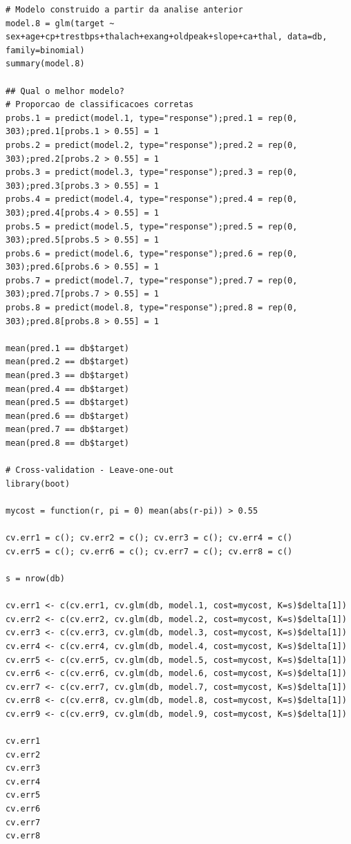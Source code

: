 \documentclass[a4paper]{report}
\begin{document}
\begin{lstlisting}[breaklines,basicstyle=\small]
# Modelo construido a partir da analise anterior
model.8 = glm(target ~ sex+age+cp+trestbps+thalach+exang+oldpeak+slope+ca+thal, data=db, family=binomial)
summary(model.8)

## Qual o melhor modelo?
# Proporcao de classificacoes corretas
probs.1 = predict(model.1, type="response");pred.1 = rep(0, 303);pred.1[probs.1 > 0.55] = 1 
probs.2 = predict(model.2, type="response");pred.2 = rep(0, 303);pred.2[probs.2 > 0.55] = 1 
probs.3 = predict(model.3, type="response");pred.3 = rep(0, 303);pred.3[probs.3 > 0.55] = 1 
probs.4 = predict(model.4, type="response");pred.4 = rep(0, 303);pred.4[probs.4 > 0.55] = 1 
probs.5 = predict(model.5, type="response");pred.5 = rep(0, 303);pred.5[probs.5 > 0.55] = 1 
probs.6 = predict(model.6, type="response");pred.6 = rep(0, 303);pred.6[probs.6 > 0.55] = 1 
probs.7 = predict(model.7, type="response");pred.7 = rep(0, 303);pred.7[probs.7 > 0.55] = 1
probs.8 = predict(model.8, type="response");pred.8 = rep(0, 303);pred.8[probs.8 > 0.55] = 1

mean(pred.1 == db$target)
mean(pred.2 == db$target)
mean(pred.3 == db$target)
mean(pred.4 == db$target)
mean(pred.5 == db$target)
mean(pred.6 == db$target)
mean(pred.7 == db$target)
mean(pred.8 == db$target)

# Cross-validation - Leave-one-out
library(boot)

mycost = function(r, pi = 0) mean(abs(r-pi)) > 0.55

cv.err1 = c(); cv.err2 = c(); cv.err3 = c(); cv.err4 = c()
cv.err5 = c(); cv.err6 = c(); cv.err7 = c(); cv.err8 = c()

s = nrow(db)

cv.err1 <- c(cv.err1, cv.glm(db, model.1, cost=mycost, K=s)$delta[1])
cv.err2 <- c(cv.err2, cv.glm(db, model.2, cost=mycost, K=s)$delta[1])
cv.err3 <- c(cv.err3, cv.glm(db, model.3, cost=mycost, K=s)$delta[1])
cv.err4 <- c(cv.err4, cv.glm(db, model.4, cost=mycost, K=s)$delta[1])
cv.err5 <- c(cv.err5, cv.glm(db, model.5, cost=mycost, K=s)$delta[1])
cv.err6 <- c(cv.err6, cv.glm(db, model.6, cost=mycost, K=s)$delta[1])
cv.err7 <- c(cv.err7, cv.glm(db, model.7, cost=mycost, K=s)$delta[1])
cv.err8 <- c(cv.err8, cv.glm(db, model.8, cost=mycost, K=s)$delta[1])
cv.err9 <- c(cv.err9, cv.glm(db, model.9, cost=mycost, K=s)$delta[1])

cv.err1
cv.err2
cv.err3
cv.err4
cv.err5
cv.err6
cv.err7
cv.err8
\end{lstlisting}
\end{document}
